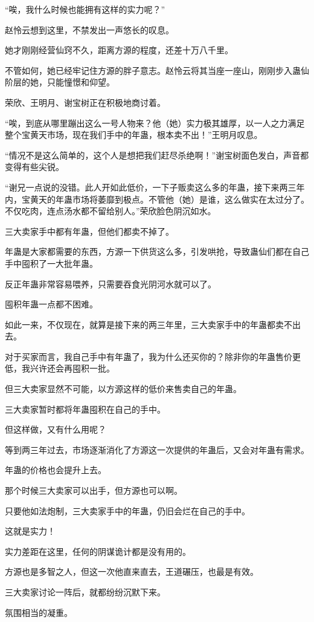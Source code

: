 \begin{this_body}
“唉，我什么时候也能拥有这样的实力呢？”

赵怜云想到这里，不禁发出一声悠长的叹息。

她才刚刚经营仙窍不久，距离方源的程度，还差十万八千里。

不管如何，她已经牢记住方源的胖子意志。赵怜云将其当座一座山，刚刚步入蛊仙阶层的她，只能憧憬和仰望。

荣欣、王明月、谢宝树正在积极地商讨着。

“唉，到底从哪里蹦出这么一号人物来？他（她）实力极其雄厚，以一人之力满足整个宝黄天市场，现在我们手中的年蛊，根本卖不出！”王明月叹息。

“情况不是这么简单的，这个人是想把我们赶尽杀绝啊！”谢宝树面色发白，声音都变得有些尖锐。

“谢兄一点说的没错。此人开如此低价，一下子贩卖这么多的年蛊，接下来两三年内，宝黄天的年蛊市场将萎靡到极点。不管他（她）是谁，这么做实在太过分了。不仅吃肉，连点汤水都不留给别人。”荣欣脸色阴沉如水。

三大卖家手中都有年蛊，但他们都卖不掉了。

年蛊是大家都需要的东西，方源一下供货这么多，引发哄抢，导致蛊仙们都在自己手中囤积了一大批年蛊。

反正年蛊非常容易喂养，只需要吞食光阴河水就可以了。

囤积年蛊一点都不困难。

如此一来，不仅现在，就算是接下来的两三年里，三大卖家手中的年蛊都卖不出去。

对于买家而言，我自己手中有年蛊了，我为什么还买你的？除非你的年蛊售价更低，我兴许还会再囤积一批。

但三大卖家显然不可能，以方源这样的低价来售卖自己的年蛊。

三大卖家暂时都将年蛊囤积在自己的手中。

但这样做，又有什么用呢？

等到两三年过去，市场逐渐消化了方源这一次提供的年蛊后，又会对年蛊有需求。

年蛊的价格也会提升上去。

那个时候三大卖家可以出手，但方源也可以啊。

只要他如法炮制，三大卖家手中的年蛊，仍旧会烂在自己的手中。

这就是实力！

实力差距在这里，任何的阴谋诡计都是没有用的。

方源也是多智之人，但这一次他直来直去，王道碾压，也最是有效。

三大卖家讨论一阵后，就都纷纷沉默下来。

氛围相当的凝重。


\end{this_body}
